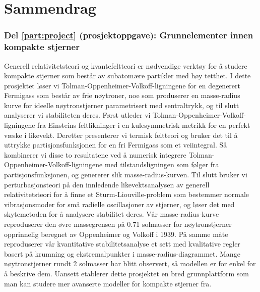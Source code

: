 \chapter*{Sammendrag}%

\subsection*{Del \ref{part:project} (prosjektoppgave): Grunnelementer innen kompakte stjerner}

Generell relativitetsteori og kvantefeltteori er nødvendige verktøy for å studere kompakte stjerner som består av subatomære partikler med høy tetthet.
I dette prosjektet løser vi Tolman-Oppenheimer-Volkoff-ligningene for en degenerert Fermigass som består av frie nøytroner,
noe som produserer en masse-radius kurve for ideelle nøytronstjerner parametrisert med sentraltrykk,
og til slutt analyserer vi stabiliteten deres.
Først utleder vi Tolman-Oppenheimer-Volkoff-ligningene fra Einsteins feltlikninger
i en kulesymmetrisk metrikk for en perfekt væske i likevekt.
Deretter presenterer vi termisk feltteori og bruker det
til å uttrykke partisjonsfunksjonen for en fri Fermigass som et veiintegral.
Så kombinerer vi disse to resultatene ved å numerisk integrere Tolman-Oppenheimer-Volkoff-ligningene
med tilstandsligningen som følger fra partisjonsfunksjonen, og genererer slik masse-radius-kurven.
Til slutt bruker vi perturbasjonsteori på den innledende likevektsanalysen av generell relativitetsteori
for å finne et Sturm-Liouville-problem som bestemmer normale vibrasjonsmoder for små radielle oscillasjoner av stjerner,
og løser det med skytemetoden for å analysere stabilitet deres.
Vår masse-radius-kurve reproduserer den øvre massegrensen på 0.71 solmasser
for nøytronstjerner opprinnelig beregnet av Oppenheimer og Volkoff i 1939.
På samme måte reproduserer vår kvantitative stabilitetsanalyse
et sett med kvalitative regler basert på krumning og ekstremalpunkter i masse-radius-diagrammet.
Mange nøytronstjerner rundt 2 solmasser har blitt observert,
så modellen er for enkel for å beskrive dem.
Uansett etablerer dette prosjektet en bred grunnplattform
som man kan studere mer avanserte modeller for kompakte stjerner fra.

\subsection*{}

